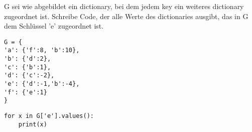 \question[6] G sei wie abgebildet ein dictionary, bei dem jedem key
ein weiteres dictionary zugeordnet ist. Schreibe Code, der alle Werte
des dictionaries ausgibt, das in G dem Schlüssel 'e' zugeordnet ist.
\begin{lstlisting}
G = {
'a': {'f':8, 'b':10},
'b': {'d':2},
'c': {'b':1},
'd': {'c':-2},
'e': {'d':-1,'b':-4},
'f': {'e':1}
}
\end{lstlisting}
\begin{solutionbox}{2cm}
\begin{lstlisting}
for x in G['e'].values():
    print(x)
\end{lstlisting}    
\end{solutionbox}
